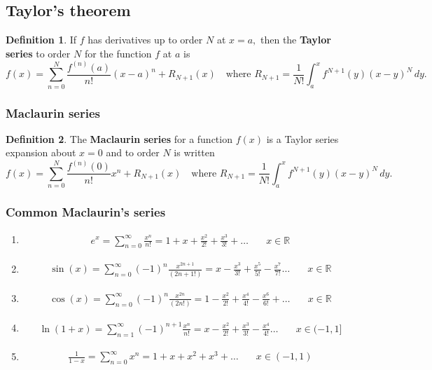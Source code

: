 \documentclass[12pt, a4paper]{article}
\newcommand{\f}[2]{\frac{#1}{#2}}
\theoremstyle{definition}
\newtheorem{definition}{Definition}[section]
\theoremstyle{plain}
\begin{document}
\subsection{Taylor's theorem}

\begin{definition}
If $f$ has derivatives up to order $N$ at $x=a,$ then the \textbf{Taylor series} to order $N$ for the function $f$ at $a$ is $$f(x)=\sum_{n=0}^N \f{f^{(n)}(a)}{n!}(x-a)^n+R_{N+1}(x) \quad \text{where } R_{N+1}=\f{1}{N!}\int_a^{x}f^{N+1}(y)(x-y)^N \, dy.$$ 
\end{definition}

\subsubsection{Maclaurin series}

\begin{definition}
The \textbf{Maclaurin series} for a function $f(x)$ is a Taylor series expansion about $x=0$ and to order $N$ is written $$f(x)=\sum_{n=0}^N \f{f^{(n)}(0)}{n!}x^n+R_{N+1}(x) \quad \text{where } R_{N+1}=\f{1}{N!}\int_a^{x}f^{N+1}(y)(x-y)^N \, dy.$$
\end{definition}

\subsubsection{Common Maclaurin's series}

\begin{enumerate}

	\item 
	$$\begin{aligned}
	e^x= \sum_{n=0}^{\infty} \frac{x^n}{n!} = 1+x+\frac{x^2}{2!}+\frac{x^3}{3!}+\ldots & \quad x \in \mathbb{R}
	\end{aligned}$$

	\item
	$$\begin{aligned}
	\sin(x)= \sum_{n=0}^{\infty} (-1)^n\frac{x^{2n+1}}{(2n+1!)} = x-\frac{x^3}{3!}+\frac{x^5}{5!}-\frac{x^7}{7!}\ldots & \quad x \in \mathbb{R}
	\end{aligned}$$

	\item
	$$\begin{aligned}
	\cos(x)= \sum_{n=0}^{\infty} (-1)^n\frac{x^{2n}}{(2n!)} = 1-\frac{x^2}{2!}+\frac{x^4}{4!}-\frac{x^6}{6!}+\ldots & \quad x \in \mathbb{R}
	\end{aligned}$$

	\item 
	$$\begin{aligned}
	\ln(1+x)= \sum_{n=1}^{\infty} (-1)^{n+1}\frac{x^n}{n!} = x-\frac{x^2}{2!}+\frac{x^3}{3!}-\frac{x^4}{4!}\ldots & \quad x \in (-1,1]	\end{aligned}$$

	\item $$\begin{aligned}
	\frac{1}{1-x}= \sum_{n=0}^{\infty} x^n = 1+x+x^2+x^3+\ldots & \quad x \in (-1,1)
	\end{aligned}$$

\end{enumerate}
\end{document}
